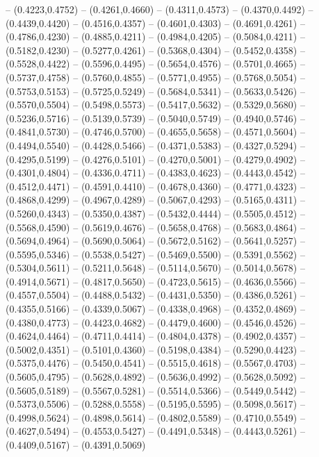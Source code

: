 {	-- (0.4223,0.4752)
	-- (0.4261,0.4660)
	-- (0.4311,0.4573)
	-- (0.4370,0.4492)
	-- (0.4439,0.4420)
	-- (0.4516,0.4357)
	-- (0.4601,0.4303)
	-- (0.4691,0.4261)
	-- (0.4786,0.4230)
	-- (0.4885,0.4211)
	-- (0.4984,0.4205)
	-- (0.5084,0.4211)
	-- (0.5182,0.4230)
	-- (0.5277,0.4261)
	-- (0.5368,0.4304)
	-- (0.5452,0.4358)
	-- (0.5528,0.4422)
	-- (0.5596,0.4495)
	-- (0.5654,0.4576)
	-- (0.5701,0.4665)
	-- (0.5737,0.4758)
	-- (0.5760,0.4855)
	-- (0.5771,0.4955)
	-- (0.5768,0.5054)
	-- (0.5753,0.5153)
	-- (0.5725,0.5249)
	-- (0.5684,0.5341)
	-- (0.5633,0.5426)
	-- (0.5570,0.5504)
	-- (0.5498,0.5573)
	-- (0.5417,0.5632)
	-- (0.5329,0.5680)
	-- (0.5236,0.5716)
	-- (0.5139,0.5739)
	-- (0.5040,0.5749)
	-- (0.4940,0.5746)
	-- (0.4841,0.5730)
	-- (0.4746,0.5700)
	-- (0.4655,0.5658)
	-- (0.4571,0.5604)
	-- (0.4494,0.5540)
	-- (0.4428,0.5466)
	-- (0.4371,0.5383)
	-- (0.4327,0.5294)
	-- (0.4295,0.5199)
	-- (0.4276,0.5101)
	-- (0.4270,0.5001)
	-- (0.4279,0.4902)
	-- (0.4301,0.4804)
	-- (0.4336,0.4711)
	-- (0.4383,0.4623)
	-- (0.4443,0.4542)
	-- (0.4512,0.4471)
	-- (0.4591,0.4410)
	-- (0.4678,0.4360)
	-- (0.4771,0.4323)
	-- (0.4868,0.4299)
	-- (0.4967,0.4289)
	-- (0.5067,0.4293)
	-- (0.5165,0.4311)
	-- (0.5260,0.4343)
	-- (0.5350,0.4387)
	-- (0.5432,0.4444)
	-- (0.5505,0.4512)
	-- (0.5568,0.4590)
	-- (0.5619,0.4676)
	-- (0.5658,0.4768)
	-- (0.5683,0.4864)
	-- (0.5694,0.4964)
	-- (0.5690,0.5064)
	-- (0.5672,0.5162)
	-- (0.5641,0.5257)
	-- (0.5595,0.5346)
	-- (0.5538,0.5427)
	-- (0.5469,0.5500)
	-- (0.5391,0.5562)
	-- (0.5304,0.5611)
	-- (0.5211,0.5648)
	-- (0.5114,0.5670)
	-- (0.5014,0.5678)
	-- (0.4914,0.5671)
	-- (0.4817,0.5650)
	-- (0.4723,0.5615)
	-- (0.4636,0.5566)
	-- (0.4557,0.5504)
	-- (0.4488,0.5432)
	-- (0.4431,0.5350)
	-- (0.4386,0.5261)
	-- (0.4355,0.5166)
	-- (0.4339,0.5067)
	-- (0.4338,0.4968)
	-- (0.4352,0.4869)
	-- (0.4380,0.4773)
	-- (0.4423,0.4682)
	-- (0.4479,0.4600)
	-- (0.4546,0.4526)
	-- (0.4624,0.4464)
	-- (0.4711,0.4414)
	-- (0.4804,0.4378)
	-- (0.4902,0.4357)
	-- (0.5002,0.4351)
	-- (0.5101,0.4360)
	-- (0.5198,0.4384)
	-- (0.5290,0.4423)
	-- (0.5375,0.4476)
	-- (0.5450,0.4541)
	-- (0.5515,0.4618)
	-- (0.5567,0.4703)
	-- (0.5605,0.4795)
	-- (0.5628,0.4892)
	-- (0.5636,0.4992)
	-- (0.5628,0.5092)
	-- (0.5605,0.5189)
	-- (0.5567,0.5281)
	-- (0.5514,0.5366)
	-- (0.5449,0.5442)
	-- (0.5373,0.5506)
	-- (0.5288,0.5558)
	-- (0.5195,0.5595)
	-- (0.5098,0.5617)
	-- (0.4998,0.5624)
	-- (0.4898,0.5614)
	-- (0.4802,0.5589)
	-- (0.4710,0.5549)
	-- (0.4627,0.5494)
	-- (0.4553,0.5427)
	-- (0.4491,0.5348)
	-- (0.4443,0.5261)
	-- (0.4409,0.5167)
	-- (0.4391,0.5069)
}

